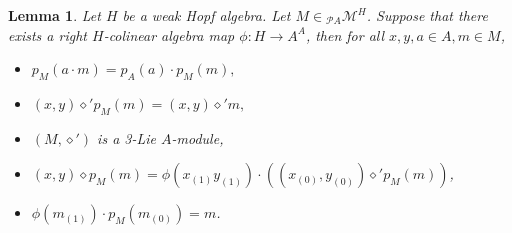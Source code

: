 \documentclass[10pt,a4paper]{amsart}
\newtheorem{lemma}{Lemma}
\def\di{\diamond}
\begin{document}
\begin{lemma}\label{lem:3d}
Let $H$ be a weak Hopf algebra. Let $M\in\! _{\mathcal{P}A}\mathcal{M}^H$. Suppose that there exists a right $H$-colinear algebra map $\phi:H\rightarrow A^A$, then for all $x,y,a\in A,m\in M$,
\begin{itemize}
  \item [(1)] $p_M(a\cdot m)=p_A(a)\cdot p_M(m),$
  \item [(2)] $(x,y)\di'p_M(m)=(x,y)\di' m,$
  \item [(3)] $(M,\di')$ is a 3-Lie $A$-module,
  \item [(4)] $(x,y)\di p_M(m)=\phi(x_{(1)}y_{(1)})\cdot ((x_{(0)},y_{(0)})\di'p_M(m))$,
  \item [(5)] $\phi(m_{(1)})\cdot p_M(m_{(0)})=m$.
\end{itemize}
\end{lemma}
\end{document}
